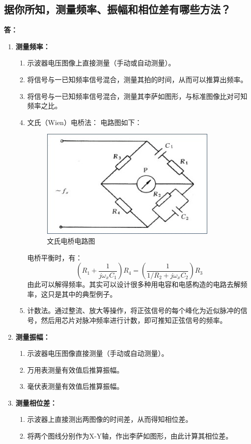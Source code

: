 \documentclass[a4paper,11pt,UTF8]{ctexart}
\begin{document}
\subsection{据你所知，测量频率、振幅和相位差有哪些方法？}
\textbf{答：}
\begin{enumerate}
 \item \textbf{测量频率：}
 \begin{enumerate}
  \item 示波器电压图像上直接测量（手动或自动测量）。
  \item 将信号与一已知频率信号混合，测量其拍的时间，从而可以推算出频率。
  \item 将信号与一已知频率信号混合，测量其李萨如图形，与标准图像比对可知频率之比。
  \item 文氏（Wien）电桥法：
  电路图如下：
  \begin{figure}[H]
   \centering
   \includegraphics{WienBridge}
   \caption{\kaishu 文氏电桥电路图}
  \end{figure}
  电桥平衡时，有：
  \[ \left( R_1+\frac{1}{j\omega_xC_1}\right )R_4 = 
     \left( \frac{1}{1/R_2+j\omega_xC_2} \right)R_3\]
  由此可以解得频率。其实可以设计很多种用电容和电感构造的电路去解频率，这只是其中的典型例子。
  \item 计数法。通过整流、放大等操作，将正弦信号的每个峰化为近似脉冲的信号，然后用芯片对脉冲频率进行计数，即可推知正弦信号的频率。
 \end{enumerate}
 \item \textbf{测量振幅：}
 \begin{enumerate}
  \item 示波器电压图像直接测量（手动或自动测量）。
  \item 万用表测量有效值后推算振幅。
  \item 毫伏表测量有效值后推算振幅。
 \end{enumerate}
 \item \textbf{测量相位差：}
 \begin{enumerate}
  \item 示波器上直接测出两图像的时间差，从而得知相位差。
  \item 将两个图线分别作为X-Y轴，作出李萨如图形，由此计算其相位差。
 \end{enumerate}
\end{enumerate}
\end{document}
